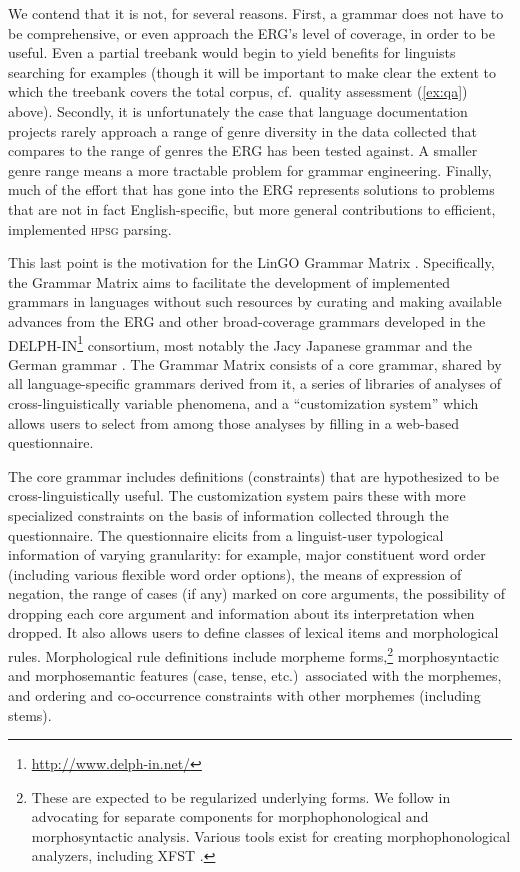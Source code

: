 \documentclass[12pt]{article}
\newcommand{\hpsg}{\textsc{hpsg}\xspace}
\begin{document}
We contend that it is not, for several reasons.  First, a grammar does
not have to be comprehensive, or even approach the ERG's level of
coverage, in order to be useful.  Even a partial treebank would begin to
yield benefits for linguists searching for examples (though it will be
important to make clear the extent to which the treebank covers the
total corpus, cf.\ {\sc quality assessment} (\ref{ex:qa}) above).
Secondly, it is unfortunately the case that language documentation
projects rarely approach a range of genre diversity in the data
collected that compares to the range of genres the ERG has been tested
against.  A smaller genre range means a more tractable problem for
grammar engineering.  Finally, much of the effort that has gone into the
ERG represents solutions to problems that are not in fact
English-specific, but more general contributions to efficient, implemented \hpsg
parsing.

This last point is the motivation for the LinGO Grammar Matrix
\cite{Ben:Fli:Oep:02,Ben:Dre:Fok:Pou:Sal:10}.  Specifically, the
Grammar Matrix aims to facilitate the development of implemented
grammars in languages without such resources by curating and making
available advances from the ERG and other broad-coverage grammars
developed in the DELPH-IN\footnote{\url{http://www.delph-in.net/}}
consortium, most notably the Jacy Japanese grammar \cite{Sie:Ben:02}
and the German grammar \cite{mueller_s-kasper_w00}.  The Grammar
Matrix consists of a core grammar, shared by all language-specific
grammars derived from it, a series of libraries of analyses of
cross-linguistically variable phenomena, and a ``customization
system'' which allows users to select from among those analyses by
filling in a web-based questionnaire.  

The core grammar includes definitions (constraints) that are
hypothesized to be cross-linguistically useful.  The customization
system pairs these with more specialized constraints on the basis of
information collected through the questionnaire. The questionnaire
elicits from a linguist-user typological information of varying
granularity: for example, major constituent word order (including
various flexible word order options), the means of expression of
negation, the range of cases (if any) marked on core arguments, the
possibility of dropping each core argument and information about its interpretation when
dropped.  It also allows users to define classes of lexical items and
morphological rules.  Morphological rule definitions include morpheme
forms,\footnote{These are expected to be regularized underlying forms.
  We follow  in advocating for separate
  components for morphophonological and morphosyntactic analysis.
  Various tools exist for creating morphophonological analyzers,
  including XFST \cite{Bee:Kar:03}.} morphosyntactic and
morphosemantic features (case, tense, etc.)\ associated with the
morphemes, and ordering and co-occurrence constraints with other
morphemes (including stems).
\end{document}
